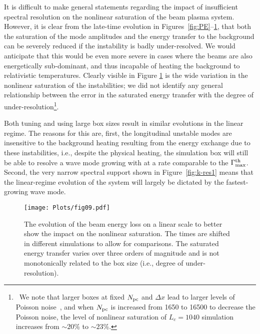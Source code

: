 \documentclass[pop,numberedappendix,iop]{aeb_emulateapj_2015}
\begin{document}
It is difficult to make general statements regarding the impact of insufficient spectral resolution on the nonlinear saturation of the beam plasma system.
However, it is clear from the late-time evolution in Figures~\ref{fig:PE}--\ref{fig:KE-linear}, that both the saturation of the mode amplitudes and the energy transfer to the background can be severely reduced if the instability is badly under-resolved.
We would anticipate that this would be even more severe in cases where the beams are also energetically sub-dominant, and thus incapable of heating the background to relativistic temperatures.
Clearly visible in Figure \ref{fig:KE-linear} is the wide variation in the nonlinear saturation of the instabilities; we did not identify any general relationship between the error in the saturated energy transfer with the degree of under-resolution\footnote{\
We note that larger boxes at fixed $N_{\rm pc}$ and $\Delta x$ lead to larger levels of Poisson noise~\citep{sharp}, and when $N_{\rm pc}$ is increased from 1650 to 16500 to decrease the Poisson noise, the level of nonlinear saturation of $L_c = 1040$ simulation increases from $\sim 20$\% to $\sim 23$\%.}.


Both tuning and using large box sizes result in similar evolutions in the linear regime.
The reasons for this are, first, the longitudinal unstable  modes are insensitive to the background heating resulting from the energy exchange due to these instabilities, i.e., despite the physical heating, the simulation box will still be able to resolve a wave mode growing with at a rate comparable to the $\Gamma_{\rm max}^{\rm th}$. 
Second, the very narrow spectral support shown in Figure~\ref{fig:k-res1} means that the linear-regime evolution of the system will largely be dictated by the fastest-growing wave mode.











\begin{figure}
\center
\texttt{[image: Plots/fig09.pdf]}
\caption{
{ 
The evolution of the beam energy loss on a linear scale to better show the impact on the nonlinear saturation.
The times are shifted in different simulations to allow for comparisons.
The saturated energy transfer varies over three orders of magnitude and is not monotonically related to the box size (i.e., degree of under-resolution).
}
\label{fig:KE-linear}}
\end{figure}
\end{document}
